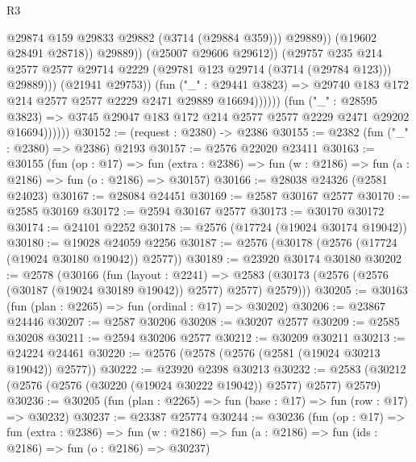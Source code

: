 \begin{lexlean}{R3}
\begin{coremodule}
                                            @29874
                                            @159
                                            @29833
                                            @29882
                                            (@3714 (@29884 @359)))
                                          @29889))
                                      (@19602 @28491 @28718))
                                    @29889))
                                (@25007 @29606 @29612))
                              (@29757
                                @235
                                @214
                                @2577
                                @2577
                                @29714
                                @2229
                                (@29781 @123 @29714 (@3714 (@29784 @123)))
                                @29889)))
                          (@21941 @29753))
                        (fun ("_" : @29441 @3823) =>
                        @29740 @183 @172 @214 @2577 @2577 @2229 @2471 @29889 @16694))))))
              (fun ("_" : @28595 @3823) =>
              @3745 @29047 @183 @172 @214 @2577 @2577 @2229 @2471 @29202 @16694))))))
@30152 := (request : @2380) -> @2386
@30155 := @2382 (fun ("_" : @2380) => @2386) @2193
@30157 := @2576 @22020 @23411
@30163 := @30155
    (fun (op : @17) =>
    fun (extra : @2386) => fun (w : @2186) => fun (a : @2186) => fun (o : @2186) => @30157)
@30166 := @28038 @24326 (@2581 @24023)
@30167 := @28084 @24451
@30169 := @2587 @30167 @2577
@30170 := @2585 @30169
@30172 := @2594 @30167 @2577
@30173 := @30170 @30172
@30174 := @24101 @2252
@30178 := @2576 (@17724 (@19024 @30174 @19042))
@30180 := @19028 @24059 @2256
@30187 := @2576 (@30178 (@2576 (@17724 (@19024 @30180 @19042)) @2577))
@30189 := @23920 @30174 @30180
@30202 := @2578
    (@30166
      (fun (layout : @2241) =>
      @2583 (@30173 (@2576 (@2576 (@30187 (@19024 @30189 @19042)) @2577) @2577) @2579)))
@30205 := @30163 (fun (plan : @2265) => fun (ordinal : @17) => @30202)
@30206 := @23867 @24446
@30207 := @2587 @30206
@30208 := @30207 @2577
@30209 := @2585 @30208
@30211 := @2594 @30206 @2577
@30212 := @30209 @30211
@30213 := @24224 @24461
@30220 := @2576 (@2578 (@2576 (@2581 (@19024 @30213 @19042)) @2577))
@30222 := @23920 @2398 @30213
@30232 := @2583 (@30212 (@2576 (@2576 (@30220 (@19024 @30222 @19042)) @2577) @2577) @2579)
@30236 := @30205 (fun (plan : @2265) => fun (base : @17) => fun (row : @17) => @30232)
@30237 := @23387 @25774
@30244 := @30236
    (fun (op : @17) =>
    fun (extra : @2386) =>
    fun (w : @2186) => fun (a : @2186) => fun (ids : @2186) => fun (o : @2186) => @30237)

\end{coremodule}
\end{lexlean}
